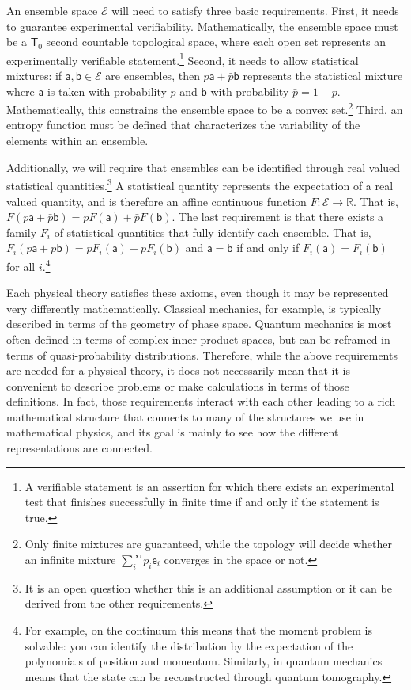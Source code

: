\documentclass[10pt,twocolumn, nofootinbib]{revtex4-2}
\newcommand{\ens}[1][e] {\mathsf{#1}} %
\newcommand{\Ens}[1][E] {\mathcal{#1}} %
\begin{document}
An ensemble space $\Ens$ will need to satisfy three basic requirements. First, it needs to guarantee experimental verifiability. Mathematically, the ensemble space must be a $\mathsf{T}_0$ second countable topological space, where each open set represents an experimentally verifiable statement.\footnote{A verifiable statement is an assertion for which there exists an experimental test that finishes successfully in finite time if and only if the statement is true.} Second, it needs to allow statistical mixtures: if $\ens[a],\ens[b] \in \Ens$ are ensembles, then $p \ens[a] + \bar{p} \ens[b]$ represents the statistical mixture where $\ens[a]$ is taken with probability $p$ and $\ens[b]$ with probability $\bar{p} = 1 - p$. Mathematically, this constrains the ensemble space to be a convex set.\footnote{Only finite mixtures are guaranteed, while the topology will decide whether an infinite mixture $\sum_{i}^{\infty} p_i \ens_i$ converges in the space or not.} Third, an entropy function must be defined that characterizes the variability of the elements within an ensemble.

Additionally, we will require that ensembles can be identified through real valued statistical quantities.\footnote{It is an open question whether this is an additional assumption or it can be derived from the other requirements.} A statistical quantity represents the expectation of a real valued quantity, and is therefore an affine continuous function $F : \Ens \to \mathbb{R}$. That is, $F(p \ens[a] + \bar{p} \ens[b]) = p F(\ens[a]) + \bar{p} F(\ens[b])$. The last requirement is that there exists a family $F_i$ of statistical quantities that fully identify each ensemble. That is, $F_i(p \ens[a] + \bar{p} \ens[b]) = p F_i(\ens[a]) + \bar{p} F_i(\ens[b])$ and $\ens[a] = \ens[b]$ if and only if $F_i(\ens[a]) = F_i(\ens[b])$ for all $i$.\footnote{For example, on the continuum this means that the moment problem is solvable: you can identify the distribution by the expectation of the polynomials of position and momentum. Similarly, in quantum mechanics means that the state can be reconstructed through quantum tomography.}

Each physical theory satisfies these axioms, even though it may be represented very differently mathematically. Classical mechanics, for example, is typically described in terms of the geometry of phase space. Quantum mechanics is most often defined in terms of complex inner product spaces, but can be reframed in terms of quasi-probability distributions. Therefore, while the above requirements are needed for a physical theory, it does not necessarily mean that it is convenient to describe problems or make calculations in terms of those definitions. In fact, those requirements interact with each other leading to a rich mathematical structure that connects to many of the structures we use in mathematical physics, and its goal is mainly to see how the different representations are connected.
\end{document}
